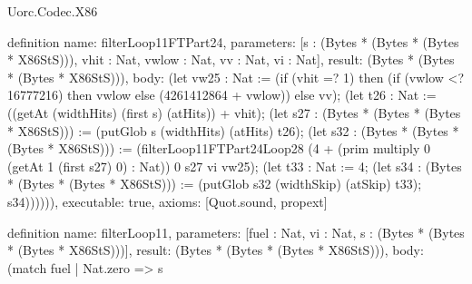 \begin{lexlean}{Uorc.Codec.X86}
\begin{semanticmodule}
definition{
  name: filterLoop11FTPart24,
  parameters: [s : (Bytes * (Bytes * (Bytes * X86StS))), vhit : Nat, vwlow : Nat, vv : Nat, vi : Nat],
  result: (Bytes * (Bytes * (Bytes * X86StS))),
  body: (let vw25 : Nat := (if (vhit =? 1) then (if (vwlow <? 16777216) then vwlow else (4261412864 + vwlow)) else vv); (let t26 : Nat := ((getAt (widthHits) (first s) (atHits)) + vhit); (let s27 : (Bytes * (Bytes * (Bytes * X86StS))) := (putGlob s (widthHits) (atHits) t26); (let s32 : (Bytes * (Bytes * (Bytes * X86StS))) := (filterLoop11FTPart24Loop28 (4 + (prim multiply 0 (getAt 1 (first s27) 0) : Nat)) 0 s27 vi vw25); (let t33 : Nat := 4; (let s34 : (Bytes * (Bytes * (Bytes * X86StS))) := (putGlob s32 (widthSkip) (atSkip) t33); s34)))))),
  executable: true,
  axioms: [Quot.sound, propext]
}

definition{
  name: filterLoop11,
  parameters: [fuel : Nat, vi : Nat, s : (Bytes * (Bytes * (Bytes * X86StS)))],
  result: (Bytes * (Bytes * (Bytes * X86StS))),
  body: (match fuel
    | Nat.zero => s
}
\end{semanticmodule}
\end{lexlean}
